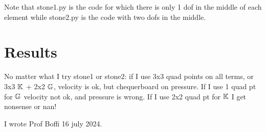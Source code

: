 Note that stone1.py is the code for which there is only 
1 dof in the middle of each element while stone2.py
is the code with two dofs in the middle.

\section*{Results}

No matter what I try stone1 or stone2: 
if I use 3x3 quad points on all terms, or 3x3 ${\mathbb{K}}$ + 2x2 ${\mathbb{G}}$, velocity is ok, but chequerboard on pressure.
If I use 1 quad pt for ${\mathbb{G}}$ velocity not ok, and pressure is wrong.
If I use 2x2 quad pt for ${\mathbb{K}}$ I get nonsense or nan!

I wrote Prof Boffi 16 july 2024.
